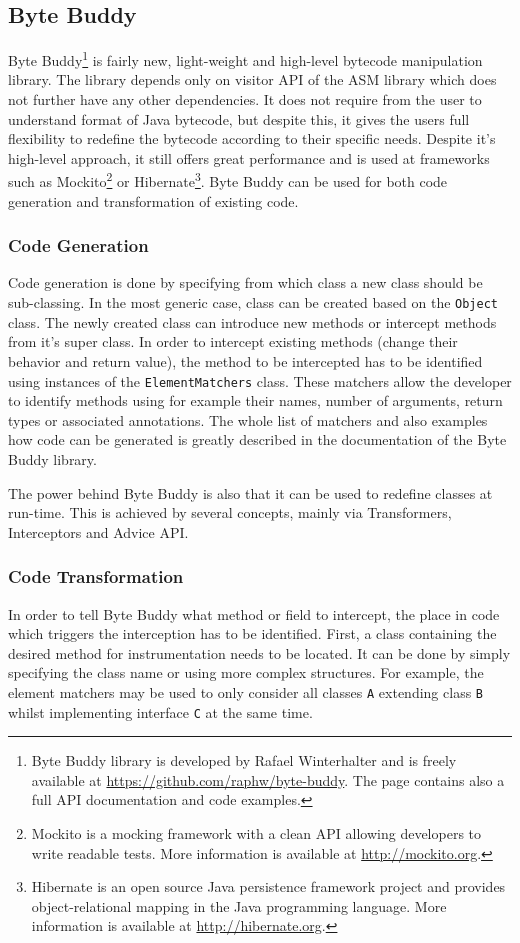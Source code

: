 \subsection{Byte Buddy}
\label{sec:byte_buddy}
Byte Buddy\footnote{Byte Buddy library is developed by Rafael Winterhalter and is freely available at \url{https://github.com/raphw/byte-buddy}. The page contains also a full API documentation and code examples.} is fairly new, light-weight and high-level bytecode manipulation library. The library depends only on visitor API of the ASM library which does not further have any other dependencies. It does not require from the user to understand format of Java bytecode, but despite this, it gives the users full flexibility to redefine the bytecode according to their specific needs. Despite it's high-level approach, it still offers great performance \cite{ByteBuddy_Perf} and is used at frameworks such as Mockito\footnote{Mockito is a mocking framework with a clean API allowing developers to write readable tests. More information is available at \url{http://mockito.org}.} or Hibernate\footnote{Hibernate is an open source Java persistence framework project and provides object-relational mapping in the Java programming language. More information is available at \url{http://hibernate.org}.}. Byte Buddy can be used for both code generation and transformation of existing code.

\subsubsection{Code Generation}
Code generation is done by specifying from which class a new class should be sub-classing. In the most generic case, class can be created based on the \texttt{Object} class. The newly created class can introduce new methods or intercept methods from it's super class. In order to intercept existing methods (change their behavior and return value), the method to be intercepted has to be identified using instances of the \texttt{ElementMatchers} class. These matchers allow the developer to identify methods using for example their names, number of arguments, return types or associated annotations. The whole list of matchers and also examples how code can be generated is greatly described in the documentation of the Byte Buddy library.

The power behind Byte Buddy is also that it can be used to redefine classes at run-time. This is achieved by several concepts, mainly via Transformers, Interceptors and Advice API.
\subsubsection{Code Transformation}
In order to tell Byte Buddy what method or field to intercept, the place in code which triggers the interception has to be identified. First, a class containing the desired method for instrumentation needs to be located. It can be done by simply specifying the class name or using more complex structures. For example, the element matchers may be used to only consider all classes \texttt{A} extending class \texttt{B} whilst implementing interface \texttt{C} at the same time. 

